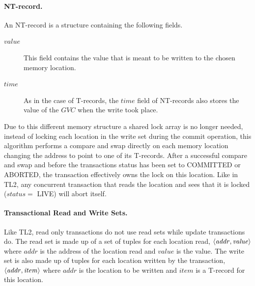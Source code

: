 \paragraph{NT-record.}
An NT-record is a structure containing the following fields.
\begin{description}
\item[$\mathit{value}$]
This field contains the value that is meant to be written to the chosen 
memory location.
\item[$\mathit{time}$]
As in the case of T-records, the $\mathit{time}$ field of NT-records 
also stores the value 
of the $\mathit{GVC}$ when the write took place.
\end{description}

Due to this different memory structure a shared lock array is no longer needed,
instead of locking each location in the write set during the commit operation, this algorithm
performs a compare and swap directly on each memory location changing the address to point to one of its T-records.
After a successful compare and swap
 and before the transactions status has been set to COMMITTED or ABORTED, the transaction effectively
owns the lock on this location.
Like in TL2, any concurrent transaction that reads the location and sees that it is locked ($\mathit{status} = $ LIVE) will
abort itself.


\paragraph{Transactional Read and Write Sets.}
Like TL2, read only transactions do not use read sets while update transactions do.
The read set is made up of a set of tuples for each location read, $\left \langle \mathit{addr, value} \right \rangle $
where $\mathit{addr}$ is the address of the location read and $\mathit{value}$ is the value.
The write set is also made up of tuples for each location written by the transaction,
$\left \langle \mathit{addr, item} \right \rangle $ where $\mathit{addr}$ is the location to be written
and $\mathit{item}$ is a T-record for this location.

